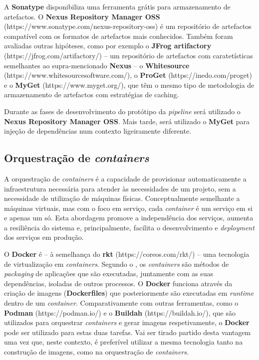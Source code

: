 \hspace{1cm}A \textbf{Sonatype} disponibiliza uma ferramenta grátis para armazenamento de artefactos. O \textbf{Nexus Repository Manager OSS} (https://www.sonatype.com/nexus-repository-oss) é um repositório de artefactos compatível com os formatos de artefactos mais conhecidos. Também foram avaliadas outras hipóteses, como por exemplo o \textbf{JFrog artifactory} (https://jfrog.com/artifactory/) -- um repositório de artefactos com caratetísticas semelhantes ao supra-mencionado \textbf{Nexus} -- o \textbf{Whitesource} (https://www.whitesourcesoftware.com/), o \textbf{ProGet} (https://inedo.com/proget) e o \textbf{MyGet} (https://www.myget.org/), que têm o mesmo tipo de metodologia de armazenamento de artefactos com estratégias de caching. 

\hspace{1cm}Durante as fases de desenvolvimento do protótipo da \textit{pipeline} será utilizado o \textbf{Nexus Repository Manager OSS}. Mais tarde, será utilizado o \textbf{MyGet} para injeção de dependências num contexto ligeiramente diferente. 

\subsection{Orquestração de \textit{containers}}

\hspace{1cm}A orquestração de \textit{containers} é a capacidade de provisionar automaticamente a infraestrutura necessária para atender às necessidades de um projeto, sem a necessidade de utilização de máquinas físicas. Conceptualmente semelhante a máquinas virtuais, mas com o foco em serviço, cada \textit{container} é um serviço em si e apenas um só. Esta abordagem promove a independência dos serviços, aumenta a resiliência do sistema e, principalmente, facilita o desenvolvimento e \textit{deployment} dos serviços em produção. 

\hspace{1cm}O \textbf{Docker} é -- à semelhança do \textbf{rkt} (https://coreos.com/rkt/) -- uma tecnologia de virtualização em \textit{containers}. Segundo o \textbf{}, os \textit{containers} são métodos de \textit{packaging} de aplicações que são executadas, juntamente com as suas dependências, isoladas de outros processos. O \textbf{Docker} funciona através da criação de imagens (\textbf{Dockerfiles}) que posteriormente são executadas em \textit{runtime} dentro de um \textit{container}. Comparativamente com outras ferramentas, como o \textbf{Podman} (https://podman.io/) e o \textbf{Buildah} (https://buildah.io/), que são utilizados para orquestrar \textit{containers} e gerar imagens respetivamente, o \textbf{Docker} pode ser utilizado para estas duas tarefas. Vai ser tirado partido desta vantagem uma vez que, neste contexto, é preferível utilizar a mesma tecnologia tanto na construção de imagens, como na orquestração de \textit{containers}.

